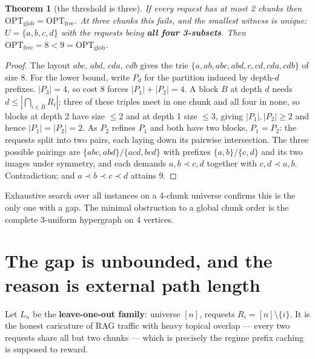 \documentclass[11pt]{article}
\theoremstyle{plain}
\newtheorem{theorem}{Theorem}
\begin{document}
\begin{theorem}[the threshold is three]
If every request has at most 2 chunks then $\mathrm{OPT}_{\mathrm{glob}} = \mathrm{OPT}_{\mathrm{free}}$. At three chunks this fails, and the smallest witness is unique: $U = \{a,b,c,d\}$ with the requests being \textbf{all four 3-subsets}. Then $\mathrm{OPT}_{\mathrm{free}} = 8 < 9 = \mathrm{OPT}_{\mathrm{glob}}$.
\end{theorem}
\begin{proof}
The layout $abc,\, abd,\, cda,\, cdb$ gives the trie $\{a, ab, abc, abd, c, cd, cda, cdb\}$ of size 8. For the lower bound, write $P_d$ for the partition induced by depth-$d$ prefixes. $|P_3| = 4$, so cost 8 forces $|P_1|+|P_2| = 4$. A block $B$ at depth $d$ needs $d \le |\bigcap_{i\in B}R_i|$; three of these triples meet in one chunk and all four in none, so blocks at depth 2 have size $\le 2$ and at depth 1 size $\le 3$, giving $|P_1|,|P_2|\ge 2$ and hence $|P_1| = |P_2| = 2$. As $P_2$ refines $P_1$ and both have two blocks, $P_1 = P_2$: the requests split into two pairs, each laying down its pairwise intersection. The three possible pairings are $\{abc,abd\}/\{acd,bcd\}$ with prefixes $\{a,b\}/\{c,d\}$ and its two images under symmetry, and each demands $a,b \prec c,d$ together with $c,d \prec a,b$. Contradiction; and $a\prec b \prec c \prec d$ attains 9. 
\end{proof}

Exhaustive search over all instances on a 4-chunk universe confirms this is the only one with a gap. The minimal obstruction to a global chunk order is the complete 3-uniform hypergraph on 4 vertices.


\section{The gap is unbounded, and the reason is external path length}

Let $L_n$ be the \textbf{leave-one-out family}: universe $[n]$, requests $R_i = [n]\setminus\{i\}$. It is the honest caricature of RAG traffic with heavy topical overlap --- every two requests share all but two chunks --- which is precisely the regime prefix caching is supposed to reward.
\end{document}
